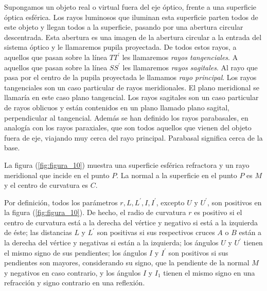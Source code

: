 \documentclass[14pt]{extarticle}
\begin{document}
Supongamos un objeto real o virtual fuera del eje óptico, frente a una superficie óptica esférica. Los rayos luminosos que iluminan esta superficie parten todos de este objeto y llegan todos a la superficie, pasando por una abertura circular descentrada. Esta abertura es una imagen de la abertura circular a la entrada del sistema óptico y le llamaremos pupila proyectada. De todos estos rayos, a aquellos que pasan sobre la línea $T T^{\prime}$ les llamaremos \textit{rayos tangenciales}. A aquellos que pasan sobre la línea $S S^{\prime}$ les llamaremos \textit{rayos sagitales}. Al rayo que pasa por el centro de la pupila proyectada le llamamos \textit{rayo principal}. Los rayos tangenciales son un caso particular de rayos meridionales. El plano meridional se llamaría en este caso plano tangencial. Los rayos sagitales son un caso particular de rayos oblicuos y están contenidos en un plano llamado plano sagital, perpendicular al tangencial. Además se han definido los rayos parabasales, en analogía con los rayos paraxiales, que son todos aquellos que vienen del objeto fuera de eje, viajando muy cerca del rayo principal. Parabasal significa cerca de la base.

La figura (\ref{fig:figura_10}) muestra una superficie esférica refractora y un rayo meridional que incide en el punto $P$. La normal a la superficie en el punto $P$ es $M$ y el centro de curvatura es $C$.

Por definición, todos los parámetros $r, L, L^{\prime}, I, I^{\prime}$, excepto $U$ y $U^{\prime}$, son positivos en la figura (\ref{fig:figura_10}). De hecho, el radio de curvatura $r$ es positivo si el centro de curvatura está a la derecha del vértice y negativo si está a la izquierda de éste; las distancias $L$ y $L^{\prime}$ son positivas si sus respectivos cruces $A$ o $B$ están a la derecha del vértice y negativas si están a la izquierda; los ángulos $U$ y $U^{\prime}$ tienen el mismo signo de sus pendientes; los ángulos $I$ y $I^{\prime}$ son positivos si sus pendientes son mayores, considerando su signo, que la pendiente de la normal $M$ y negativos en caso contrario, y los ángulos $I$ y $I_{1}$ tienen el mismo signo en una refracción y signo contrario en una reflexión.
\end{document}
